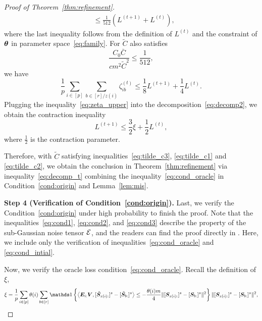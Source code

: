 \documentclass[lettersize,onecolumn,journal]{IEEEtran}
\theoremstyle{definition}
\theoremstyle{definition}
\newcommand{\offf}[1]{\left\{#1\right\}}
\newcommand{\ang}[1]{\left\langle#1\right\rangle}
\def\fixme#1#2{\textbf{\color{red}[FIXME (#1): #2]}}
\begin{document}
\begin{proof}[Proof of Theorem~\ref{thm:refinement}]
\begin{align}
         & \leq \frac{1}{512} (L^{(t+1)} + L^{(t)}), \label{eq:g_sum}
    \end{align}
    where the last inequality follows from the definition of $L^{(t)}$ and the constraint of $\boldsymbol{\theta}$ in parameter space~\eqref{eq:family}. 
   For $\tilde C$ also satisfies 
    \begin{equation}\label{eq:tilde_c3}
         \frac{C_0 \bar C}{c m^2 \tilde C^2} \leq \frac{1}{512},
    \end{equation}
    we have 
    \begin{equation}\label{eq:zeta_upper}
        \frac{1}{p}\sum_{i \in [p] }  \sum_{b \in [r]/z(i)}  \zeta_{ib}^{(t)} \leq  \frac{1}{8} L^{(t+1)}  + \frac{1}{4} L^{(t)}.
    \end{equation}
    Plugging the inequality~\eqref{eq:zeta_upper} into the decomposition~\eqref{eq:decomp2}, we obtain the contraction inequality 
    \begin{equation}\label{eq:decomp_t}
          L^{(t+1)} \leq \frac{3}{2} \xi  + \frac{1}{2} L^{(t)},
    \end{equation}
     where $\frac{1}{2}$ is the contraction parameter. 
     
     Therefore, with $\tilde C$ satisfying inequalities~\eqref{eq:tilde_c3}, \eqref{eq:tilde_c1} and \eqref{eq:tilde_c2}, we obtain the conclusion in Theorem~\ref{thm:refinement} via inequality~\eqref{eq:decomp_t} combining the inequality~\eqref{eq:cond_oracle} in Condition~\ref{cond:origin} and Lemma~\ref{lem:mis}.
     
    
   
    
    {\bf Step 4 (Verification of Condition~\ref{cond:origin}).} Last, we verify the Condition~\ref{cond:origin} under high probability to finish the proof. Note that the inequalities~\eqref{eq:cond1}, \eqref{eq:cond2}, and \eqref{eq:cond3} describe the property of the sub-Gaussian noise tensor $\mathcal{E}$, and the readers can find the proof directly in \citet[Step 5, Proof of Theorem 2]{han2020exact}. Here, we include only the verification of inequalities~\eqref{eq:cond_oracle} and \eqref{eq:cond_intial}.
    
    Now, we verify the oracle loss condition~\eqref{eq:cond_oracle}. Recall the definition of $\xi$,
    \begin{align}
        \xi = \frac{1}{p} \sum_{i \in [p]} \theta(i) \sum_{b \in [r]} \ind \offf{  \ang{ \mE_{i:} \mV, [  \tilde \mS_{z(i):} ]^s - [  \tilde \mS_{b:} ]^s }  \leq - \frac{\theta(i) m}{4} \onormSize{}{ [ \mS_{z(i):}  ]^s - [ \mS_{b:}  ]^s  }^2 } \onormSize{}{ [ \mS_{z(i):}  ]^s - [ \mS_{ b:}  ]^s  }^2,
    \end{align}


\end{proof}
\end{document}
